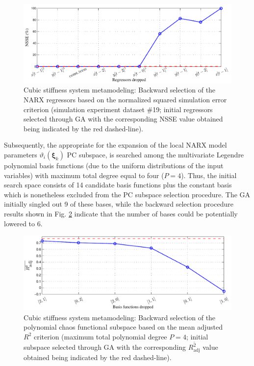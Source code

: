 \documentclass[preprint,3p,review,times,11pt]{elsarticle}
\newcommand{\bld}[1]{\boldsymbol{#1}}
\newcommand{\bxi}{\bld{\xi}}
\begin{document}
  
\begin{figure}[t!]
\begin{center}
\includegraphics[width = 1\textwidth]{figs/cubic_MSS_StageA.pdf}
\caption{Cubic stiffness system metamodeling: Backward selection of the NARX regressors based on the normalized squared simulation error criterion (simulation experiment dataset $\#$19; initial regressors selected through GA with the corresponding NSSE value obtained being indicated by the red dashed-line). \label{fig:cubic_MSS_A}}
\end{center}
\end{figure}

Subsequently, the appropriate for the expansion of the local NARX model parameters $\vartheta_i(\bxi_k)$ PC subspace, is searched among the multivariate Legendre polynomial basis functions (due to the uniform distributions of the input variables) with maximum total degree equal to four ($P = 4$). Thus, the initial search space consists of 14 candidate basis functions plus the constant basis which is nonetheless excluded from the PC subspace selection procedure. The GA initially singled out 9 of these bases, while the backward selection procedure results shown in Fig. \ref{fig:cubic_MSS_B} indicate that the number of bases could be potentially lowered to 6. 


\begin{figure}[t!]
\begin{center}
\includegraphics[width = 1\textwidth]{figs/cubic_MSS_StageB.pdf}
\caption{Cubic stiffness system metamodeling: Backward selection of the polynomial chaos functional subspace based on the mean adjusted $R^2$ criterion (maximum total polynomial degree $P=4$; initial subspace selected through GA with the corresponding $\overline{R^2_\text{adj}}$ value obtained being indicated by the red dashed-line).} \label{fig:cubic_MSS_B}
\end{center}
\end{figure}
\end{document}
